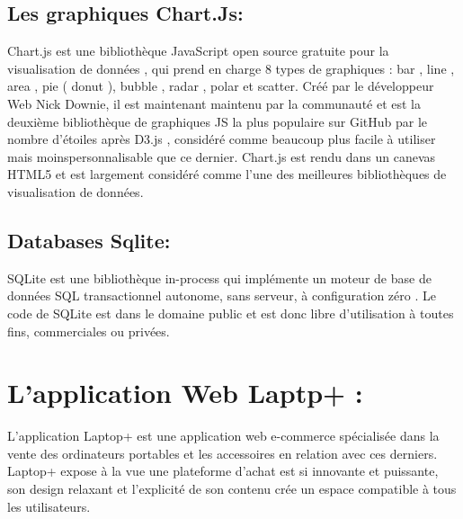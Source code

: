 \documentclass[a4paper]{report}
\begin{document}
\begin{doublespace}
\begin{doublespace}
\begin{doublespace}
\begin{doublespace}
\begin{doublespace}
                    \subsection{ Les graphiques Chart.Js:}
                    \begin{figure}[H]
                        \raggedleft{
                        }
                    \end{figure}
                    Chart.js est une bibliothèque JavaScript open source
                    gratuite pour la visualisation de données , qui prend en charge 8 types de
                    graphiques : bar , line , area , pie ( donut ), bubble , radar , polar et
                    scatter. Créé par le développeur Web  Nick Downie, il est maintenant maintenu
                    par la communauté et est la deuxième bibliothèque de graphiques JS la plus
                    populaire sur GitHub par le nombre d'étoiles après D3.js , considéré comme
                    beaucoup plus facile à utiliser mais moinspersonnalisable que ce dernier.
                    Chart.js est rendu dans un canevas HTML5 et est largement considéré comme l'une
                    des meilleures bibliothèques de visualisation de données.
                    \subsection{Databases Sqlite:}
                    \begin{figure}[H]
                        \raggedleft{
                        }
                    \end{figure}
                    SQLite est une bibliothèque in-process qui implémente
                    un moteur de base de données SQL transactionnel autonome, sans serveur, à
                    configuration zéro . Le code de SQLite est dans le domaine public et est donc
                    libre d'utilisation à toutes fins, commerciales ou privées.
                    \newpage
                    \section{L'application Web Laptp+ :}
                    L'application Laptop+ est une application web
                    e-commerce spécialisée dans la vente des ordinateurs portables et les
                    accessoires en relation avec ces derniers. \\Laptop+ expose à la vue une
                    plateforme d'achat est si innovante et puissante, son design relaxant et
                    l’explicité de son contenu crée un espace compatible à tous les utilisateurs.


\end{doublespace}
\end{doublespace}
\end{doublespace}
\end{doublespace}
\end{doublespace}
\end{document}
